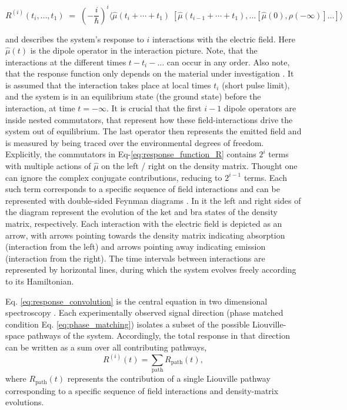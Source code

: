 \begin{equation}
	R^{(i)}(t_{i},\ldots,t_{1})
	\;=\;
	\left(-\frac{i}{\hbar}\right)^{i}
	\Big\langle
	\hat{\mu}(t_{i}+\cdots + t_{1})\;[\hat{\mu}(t_{i-1}+\cdots + t_{1}),\ldots [\hat{\mu}(0),\rho(-\infty)]\ldots]
	\Big\rangle
	\label{eq:response_function_R}
\end{equation}

\noindent
and describes the system's response to $i$ interactions with the electric field.
Here $\hat{\mu}(t)$ is the dipole operator in the interaction picture.
Note, that the interactions at the different times $t - t_{i} - \ldots$ can occur in any order.
Also note, that the response function only depends on the material under investigation \cite{hamm2005principlesnonlinearoptical}.
It is assumed that the interaction takes place at local times $t_i$ (short pulse limit), and the system is in an equilibrium state (the ground state) before the interaction, at time $t = - \infty$.
It is crucial that the first $i-1$ dipole operators are inside nested commutators, that represent how these field-interactions drive the system out of equilibrium. The last operator then represents the emitted field and is measured by being traced over the environmental degrees of freedom.
Explicitly, the commutators in Eq-\eqref{eq:response_function_R} contains $2^i$ terms with multiple actions of $\hat{\mu}$ on the left / right on the density matrix.
Thought one can ignore the complex conjugate contributions, reducing to $2^{i-1}$ terms.
Each such term corresponds to a specific sequence of field interactions and can be represented with double-sided Feynman diagrams \cite{mukamel1995principlesnonlinearoptical}. In it the left and right sides of the diagram represent the evolution of the ket and bra states of the density matrix, respectively. Each interaction with the electric field is depicted as an arrow, with arrows pointing towards the density matrix indicating absorption (interaction from the left) and arrows pointing away indicating emission (interaction from the right). The time intervals between interactions are represented by horizontal lines, during which the system evolves freely according to its Hamiltonian.


\noindent
Eq. \eqref{eq:response_convolution} is the central equation in two dimensional spectroscopy \cite{segarra-martietal2018accuratesimulationtwodimensional}. Each experimentally observed signal direction (phase matched condition Eq. \eqref{eq:phase_matching}) isolates a subset of the possible Liouville-space pathways of the system.
Accordingly, the total response in that direction can be written as a sum over all contributing pathways,
\begin{equation}
	R^{(i)}(t) = \sum_{\text{path}} R_{\text{path}}(t),
	\label{eq:Liouville_pathways}
\end{equation}
where $R_{\text{path}}(t)$ represents the contribution of a single Liouville pathway corresponding to a specific sequence of field interactions and density-matrix evolutions.


